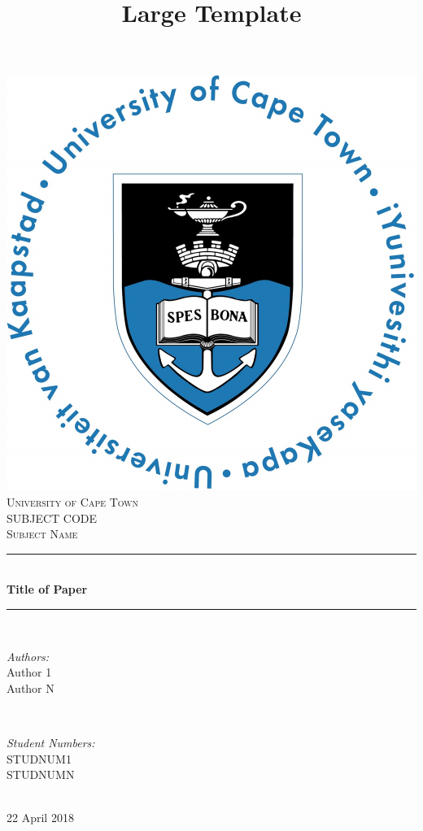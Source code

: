 \title{Large Template}


\begin{titlepage}
	\centering
	\vspace*{0.5 cm}
	\includegraphics[scale = 0.5]{Figures/UCT.jpg}\\[1 cm]	%
	\textsc{\LARGE University of Cape Town}\\[2.0 cm]	%
	\textsc{\Large SUBJECT CODE}\\[0.5 cm]				%
	\textsc{\large Subject Name}\\[0.5 cm]				%
	\rule{\linewidth}{0.2 mm} \\[0.4 cm]
	{ \huge \bfseries Title of Paper}\\
	\rule{\linewidth}{0.2 mm} \\[1.5 cm]
	
	\begin{minipage}{0.4\textwidth}
		\begin{flushleft} \large
			\emph{Authors:}\\
			Author 1\\
            Author N
		\end{flushleft}
	\end{minipage}~
	\begin{minipage}{0.4\textwidth}
		\begin{flushright} \large
			\emph{Student Numbers:} \\
			STUDNUM1\\	
            STUDNUMN
		\end{flushright}
	\end{minipage}\\[2 cm]
	
	{\large 22 April 2018}\\[2 cm]
	
	\vfill
	
\end{titlepage}